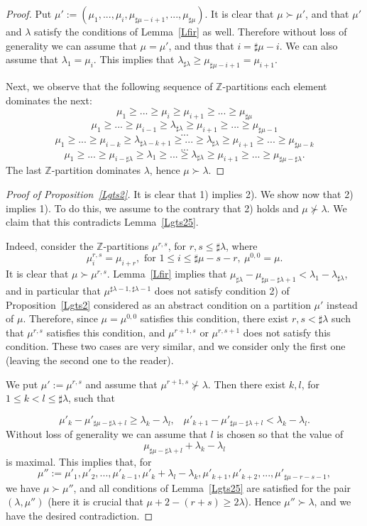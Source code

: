 \documentclass[10pt]{amsart}\oddsidemargin -1mm \evensidemargin -1mm \topmargin -15mm\headheight5mm \headsep 3.5mm \textheight 245mm\textwidth 170mm %
\begin{document}
\begin{proof} Put $\mu':=(\mu_1,..., \mu_i, \mu_{\sharp\mu-i+1},..., \mu_{\sharp\mu})$. It is clear that $\mu\succ\mu'$, and that $\mu'$ and $\lambda$ satisfy the conditions of Lemma~\ref{Lfir} as well. Therefore without loss of generality we can assume that $\mu=\mu'$, and thus that $i=\sharp\mu-i$. We can also assume that $\lambda_1=\mu_i$. This implies that $\lambda_{\sharp\lambda}\ge\mu_{\sharp\mu-i+1}=\mu_{i+1}.$

Next, we observe that the following sequence of $\mathbb Z$-partitions each element dominates the next:
$$\mu_1\ge...\ge\mu_i\ge\mu_{i+1}\ge...\ge\mu_{\sharp\mu}$$
$$\mu_1\ge...\ge\mu_{i-1}\ge\lambda_{\sharp\lambda}\ge\mu_{i+1}\ge...\ge\mu_{\sharp\mu-1}$$
$$...$$
$$\mu_1\ge...\ge\mu_{i-k}\ge\lambda_{\sharp\lambda-k+1}\ge...\ge\lambda_{\sharp\lambda}\ge\mu_{i+1}\ge...\ge\mu_{\sharp\mu-k}$$
$$...$$
$$\mu_1\ge...\ge\mu_{i-\sharp\lambda}\ge\lambda_1\ge...\ge\lambda_{\sharp\lambda}\ge\mu_{i+1}\ge...\ge\mu_{\sharp\mu-\sharp\lambda}.$$
The last $\mathbb Z$-partition dominates $\lambda$, hence $\mu\succ\lambda$.
\end{proof}
\begin{proof}[Proof of Proposition~\ref{Lgts2}]It is clear that 1) implies 2). We show now that 2) implies 1). To do this, we assume to the contrary that 2) holds and $\mu\not\succ\lambda$. We claim that this contradicts Lemma~\ref{Lgts25}.

Indeed, consider the $\mathbb Z$-partitions $\mu^{r, s}$, for $r, s\le\sharp\lambda$, where
$$\mu_i^{r, s}=\mu_{i+r},\mbox{~for~}1\le i\le \sharp\mu-s-r,~\mu^{0, 0}=\mu.$$
It is clear that $\mu\succ\mu^{r, s}$. Lemma~\ref{Lfir} implies that $\mu_{\sharp\lambda}-\mu_{\sharp\mu-\sharp\lambda+1}<\lambda_1-\lambda_{\sharp\lambda}$, and in particular that $\mu^{\sharp\lambda-1, \sharp\lambda-1}$ does not satisfy condition 2) of Proposition~\ref{Lgts2} considered as an abstract condition on a partition $\mu'$ instead of $\mu$. Therefore, since $\mu=\mu^{0, 0}$ satisfies this condition, there exist $r, s<\sharp\lambda$ such that $\mu^{r, s}$ satisfies this condition, and $\mu^{r+1, s}$ or $\mu^{r, s+1}$ does not satisfy this condition. These two cases are very similar, and we consider only the first one (leaving the second one to the reader).

We put $\mu':=\mu^{r, s}$ and assume that $\mu^{r+1, s}\not\succ\lambda$. Then there exist $k, l$, for $1\le k< l\le\sharp\lambda$, such that

$$\mu'_k-\mu'_{\sharp\mu-\sharp\lambda+l}\ge\lambda_k-\lambda_l,\hspace{10pt}\mu'_{k+1}-\mu'_{\sharp\mu-\sharp\lambda+l}< \lambda_k-\lambda_l.$$
Without loss of generality we can assume that $l$ is chosen so that the value of
$$\mu_{\sharp\mu-\sharp\lambda+l}+\lambda_k-\lambda_l$$
is maximal. This implies that, for
$$\mu'':=\mu'_1, \mu'_2,..., \mu'_{k-1}, \mu'_k+\lambda_l-\lambda_k, \mu'_{k+1}, \mu'_{k+2},..., \mu'_{\sharp\mu-r-s-1},$$
we have $\mu\succ\mu''$, and all conditions of Lemma~\ref{Lgts25} are satisfied for the pair $(\lambda, \mu'')$ (here it is crucial that $\mu+2-(r+s)\ge 2\lambda$). Hence $\mu''\succ\lambda$, and we have the desired contradiction.\end{proof}
\end{document}

